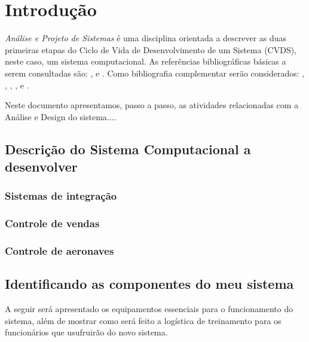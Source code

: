 

\chapter{ Introdu\c{c}\~{a}o}

\textit{An\'{a}lise e Projeto de Sistemas} \'{e} uma disciplina orientada a descrever as duas primeiras etapas do Ciclo de Vida de Desenvolvimento de um Sistema (CVDS), neste caso, um sistema computacional.  As refer\^{e}ncias bibliogr\'{a}ficas b\'{a}sicas a serem consultadas s\~{a}o: \cite{Dennis2014}, \cite{Dennis2019} \cite{Gane1983} e \cite{Sommerville2011}. Como bibliografia complementar ser\~{a}o considerados: \cite{Satzinger2012}, \cite{Shelly2012}, \cite{Valacich2020}, \cite{Kendall2020}, \cite{Budgen2021} e \cite{Engholm2013}.

Neste documento apresentamos, passo a passo,  as atividades relacionadas com a An\'{a}lise e Design do sistema....


\section{Descri\c{c}\~{a}o do Sistema Computacional a desenvolver}

\subsection{Sistemas de integração}

\subsection{Controle de vendas}

\subsection{Controle de aeronaves}


\section{Identificando as componentes do meu sistema}
A seguir será apresentado os equipamentos essenciais para o funcionamento do sistema, além de
mostrar como será feito a logística de treinamento para os funcionários que usufruirão do novo
sistema.

